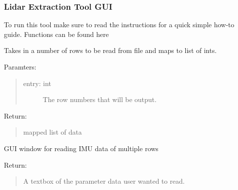 \documentclass[letterpaper,10pt,english]{sphinxmanual}
\begin{document}
\subsubsection{Lidar Extraction Tool GUI}
\label{\detokenize{Lidar extraction tool:lidar-extraction-tool-gui}}
To run this tool make sure to read the instructions for a quick simple how-to guide.
Functions can be found here

\label{\detokenize{Lidar extraction tool:module-test_lidar_gui}}

\begin{fulllineitems}
\label{\detokenize{Lidar extraction tool:test_lidar_gui.command}}
Takes in a number of rows to be read from file and maps to list of ints.

Paramters:
\begin{quote}
\begin{description}
\item[{entry: int}] \leavevmode
The row numbers that will be output.

\end{description}
\end{quote}

Return:
\begin{quote}

mapped list of data
\end{quote}

\end{fulllineitems}


\begin{fulllineitems}
\label{\detokenize{Lidar extraction tool:test_lidar_gui.imu_multiple_row}}
GUI window for reading IMU data of multiple rows

Return:
\begin{quote}

A textbox of the parameter data user wanted to read.
\end{quote}

\end{fulllineitems}
\end{document}
